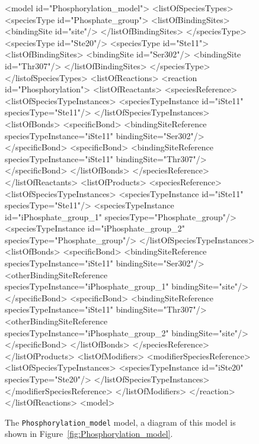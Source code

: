 \documentclass{cekarticle}
\begin{document}
\begin{figure}[h]
\begin{example}
<model id="Phosphorylation_model">
    <listOfSpeciesTypes>
        <speciesType id="Phosphate_group">
            <listOfBindingSites>
                <bindingSite id="site"/>
            </listOfBindingSites>
        </speciesType>
        <speciesType id="Ste20"/>
        <speciesType id="Ste11">
            <listOfBindingSites>
                <bindingSite id="Ser302"/>
                <bindingSite id="Thr307"/>
            </listOfBindingSites>
        </speciesType>
    </listofSpeciesTypes>
    <listOfReactions>
        <reaction id="Phosphorylation">
            <listOfReactants>
                <speciesReference>
                    <listOfSpeciesTypeInstances>
                        <speciesTypeInstance id="iSte11" speciesType="Ste11"/>
                    </listOfSpeciesTypeInstances>
                    <listOfBonds>
                        <specificBond>
                            <bindingSiteReference speciesTypeInstance="iSte11" bindingSite="Ser302"/>
                        </specificBond>
                        <specificBond>
                            <bindingSiteReference speciesTypeInstance="iSte11" bindingSite="Thr307"/>
                        </specificBond>
                    </listOfBonds>
                </speciesReference>
            </listOfReactants>
            <listOfProducts>
                <speciesReference>
                    <listOfSpeciesTypeInstances>
                        <speciesTypeInstance id="iSte11" speciesType="Ste11"/>
                        <speciesTypeInstance id="iPhosphate_group_1" speciesType="Phosphate_group"/>
                        <speciesTypeInstance id="iPhosphate_group_2" speciesType="Phosphate_group"/>
                    </listOfSpeciesTypeInstances>
                    <listOfBonds>
                        <specificBond>
                            <bindingSiteReference speciesTypeInstance="iSte11" bindingSite="Ser302"/>
                            <otherBindingSiteReference
                                speciesTypeInstance="iPhosphate_group_1" bindingSite="site"/>
                        </specificBond>
                        <specificBond>
                            <bindingSiteReference speciesTypeInstance="iSte11" bindingSite="Thr307"/>
                            <otherBindingSiteReference
                                speciesTypeInstance="iPhosphate_group_2" bindingSite="site"/>
                        </specificBond>
                    </listOfBonds>
                </speciesReference>
            </listOfProducts>
            <listOfModifiers>
                <modifierSpeciesReference>
                    <listOfSpeciesTypeInstances>
                        <speciesTypeInstance id="iSte20" speciesType="Ste20"/>
                    </listOfSpeciesTypeInstances>
                </modifierSpeciesReference>
            </listOfModifiers>
        </reaction>
    </listOfReactions>
<model>
\end{example}
  \caption{The \texttt{Phosphorylation\_model} model, a diagram of this model is shown in
  Figure~\ref{fig:Phosphorylation_model}.}
  \label{fig:Phosphorylation_model-xml}
\end{figure}
\end{document}

